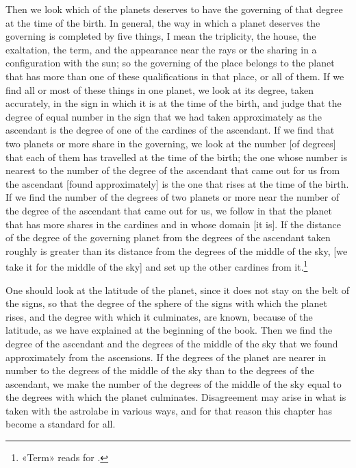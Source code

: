 \documentclass[11pt]{article}
\newcommand{\Fol}[1]{\marginpar{\footnotesize\color{gray}f.\,#1}}
\begin{document}
\par \Fol{35v}Then we look which of the planets deserves to have the governing of that degree at the time of the birth. In general, the way in which a planet deserves the governing is completed by five things, I mean the triplicity, the house, the exaltation, the term, and the appearance near the rays or the sharing in a configuration with the sun; so the governing of the place belongs to the planet that has more than one of these qualifications in that place, or all of them. If we find all or most of these things in one planet, we look at its degree, taken accurately, in the sign in which it is at the time of the birth, and judge that the degree of equal number in the sign that we had taken approximately as the ascendant is the degree of one of the cardines of the ascendant. If we find that two planets or more share in the governing, we look at the number [of degrees] that each of them has travelled at the time of the birth; the one whose number is nearest to the number of the degree of the ascendant that came out for us from the ascendant [found approximately] is the one that rises at the time of the birth. If we find the number of the degrees of two planets or more near the number of the degree of the ascendant that came out for us, we follow in that the planet that has more shares in the cardines and in whose domain [it is]. If the distance of the degree of the governing planet from the degrees of the ascendant taken roughly is greater than its distance from the degrees of the middle of the sky, [we take it for the middle of the sky] and set up the other cardines from it.\footnote{«Term» reads  for .}\par
\par One should look at the latitude of the planet, since it does not stay on the belt of the signs, so that the degree of the sphere of the signs with which the planet rises, and the degree with which it culminates, are known, because of the latitude, as we have explained at the beginning of the book. Then we find the degree of the ascendant and the degrees of the middle of the sky that we found approximately from the ascensions. If the degrees of the planet are nearer in number to the degrees of the middle of the sky than to the degrees of the ascendant, we make the number of the degrees of the middle of the sky equal to the degrees with which the planet culminates. Disagreement may arise in what is taken with the astrolabe in various ways, and for that reason this chapter has become a standard for all.\par
\end{document}
